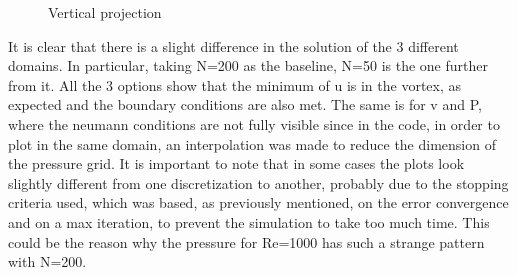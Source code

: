 \documentclass{article}
\begin{document}
\begin{figure}[h!]
\begin{minipage}{0.49\textwidth}
    \caption{Vertical projection}
  \end{minipage}
\end{figure}
It is clear that there is a slight difference in the solution of the 3 different domains. In particular, taking N=200 as the baseline, N=50 is the one further from it.
All the 3 options show that the minimum of u is in the vortex, as expected and the boundary conditions are also met. The same is for v and P, where the neumann conditions are not fully visible since in the code, in order to plot in the same domain, an interpolation was made to reduce the dimension of the pressure grid.
It is important to note that in some cases the plots look slightly different from one discretization to another, probably due to the stopping criteria used, which was based, as previously mentioned, on the error convergence and on a max iteration, to prevent the simulation to take too much time. This could be the reason why the pressure for Re=1000 has such a strange pattern with N=200.
\end{document}
